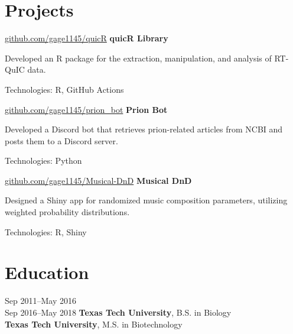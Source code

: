 \documentclass{resume}
\begin{document}
    
    \section{Projects}

        \begin{software}{\href{https://github.com/gage1145/quicR}{github.com/gage1145/quicR}}
            \textbf{quicR Library}
        \end{software}
        \begin{highlights}
            \item Developed an R package for the extraction, manipulation, and analysis of RT-QuIC data.
            \item Technologies: R, GitHub Actions
        \end{highlights}

        \begin{software}{\href{https://github.com/gage1145/prion_bot}{github.com/gage1145/prion\_bot}}
            \textbf{Prion Bot}
        \end{software}
        \begin{highlights}
            \item Developed a Discord bot that retrieves prion-related articles from NCBI and posts them to a Discord server.
            \item Technologies: Python
        \end{highlights}

        \begin{software}{\href{https://github.com/gage1145/Musical-DnD}{github.com/gage1145/Musical-DnD}}
            \textbf{Musical DnD}
        \end{software}
        \begin{highlights}
            \item Designed a Shiny app for randomized music composition parameters, utilizing weighted probability distributions.
            \item Technologies: R, Shiny
        \end{highlights}


    \section{Education}

        \begin{twocolentry}{
            Sep 2011--May 2016\\
            Sep 2016--May 2018
        }
            \textbf{Texas Tech University}, B.S. in Biology\\
            \textbf{Texas Tech University}, M.S. in Biotechnology
        \end{twocolentry}
\end{document}
